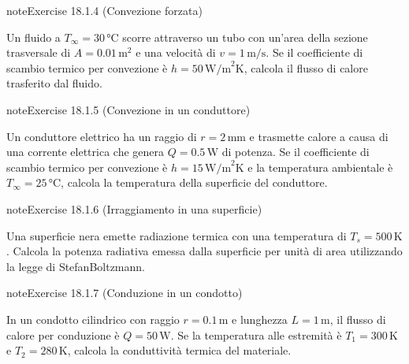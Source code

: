 \documentclass[letterpaper,10pt,italian]{jupyterBook}
\begin{document}
\begin{sphinxadmonition}{note}{Exercise 18.1.4 (Convezione forzata)}



\sphinxAtStartPar
Un fluido a \(T_\infty = 30 \, \text{°C}\) scorre attraverso un tubo con un’area della sezione trasversale di \(A = 0.01 \, \text{m}^2\) e una velocità di \(v = 1 \, \text{m/s}\). Se il coefficiente di scambio termico per convezione è \(h = 50 \, \text{W/m}^2\text{K}\), calcola il flusso di calore trasferito dal fluido.
\end{sphinxadmonition}
 \label{exercise:ch/thermodynamics/heat-transmission-problems-exercise-4}

\begin{sphinxadmonition}{note}{Exercise 18.1.5 (Convezione in un conduttore)}



\sphinxAtStartPar
Un conduttore elettrico ha un raggio di \(r = 2 \, \text{mm}\) e trasmette calore a causa di una corrente elettrica che genera \(Q = 0.5 \, \text{W}\) di potenza. Se il coefficiente di scambio termico per convezione è \(h = 15 \, \text{W/m}^2\text{K}\) e la temperatura ambientale è \(T_\infty = 25 \, \text{°C}\), calcola la temperatura della superficie del conduttore.
\end{sphinxadmonition}
 \label{exercise:ch/thermodynamics/heat-transmission-problems-exercise-5}

\begin{sphinxadmonition}{note}{Exercise 18.1.6 (Irraggiamento in una superficie)}



\sphinxAtStartPar
Una superficie nera emette radiazione termica con una temperatura di \(T_s = 500 \, \text{K}\). Calcola la potenza radiativa emessa dalla superficie per unità di area utilizzando la legge di Stefan\sphinxhyphen{}Boltzmann.
\end{sphinxadmonition}
 \label{exercise:ch/thermodynamics/heat-transmission-problems-exercise-6}

\begin{sphinxadmonition}{note}{Exercise 18.1.7 (Conduzione in un condotto)}



\sphinxAtStartPar
In un condotto cilindrico con raggio \(r = 0.1 \, \text{m}\) e lunghezza \(L = 1 \, \text{m}\), il flusso di calore per conduzione è \(Q = 50 \, \text{W}\). Se la temperatura alle estremità è \(T_1 = 300 \, \text{K}\) e \(T_2 = 280 \, \text{K}\), calcola la conduttività termica del materiale.
\end{sphinxadmonition}
 \label{exercise:ch/thermodynamics/heat-transmission-problems-exercise-7}
\end{document}

